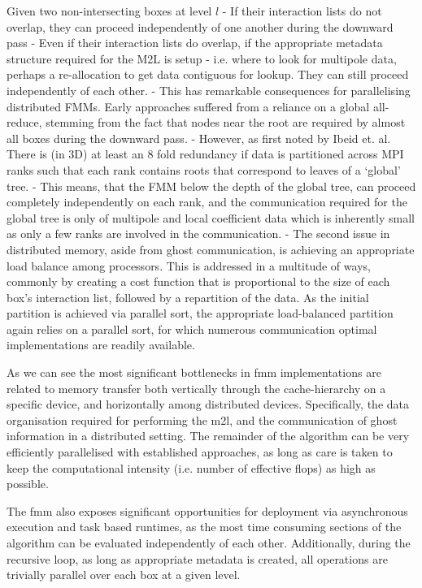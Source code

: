 Given two non-intersecting boxes at level $l$
- If their interaction lists do not overlap, they can proceed independently of one another during the downward pass
- Even if their interaction lists do overlap, if the appropriate metadata structure required for the M2L is setup - i.e. where to look for multipole data, perhaps a re-allocation to get data contiguous for lookup. They can still proceed independently of each other.
- This has remarkable consequences for parallelising distributed FMMs. Early approaches suffered from a reliance on a global all-reduce, stemming from the fact that nodes near the root are required by almost all boxes during the downward pass.
- However, as first noted by Ibeid et. al. There is (in 3D) at least an 8 fold redundancy if data is partitioned across MPI ranks such that each rank contains roots that correspond to leaves of a `global' tree.
- This means, that the FMM below the depth of the global tree, can proceed completely independently on each rank, and the communication required for the global tree is only of multipole and local coefficient data which is inherently small as only a few ranks are involved in the communication.
- The second issue in distributed memory, aside from ghost communication, is achieving an appropriate load balance among processors. This is addressed in a multitude of ways, commonly by creating a cost function that is proportional to the size of each box's interaction list, followed by a repartition of the data. As the initial partition is achieved via parallel sort, the appropriate load-balanced partition again relies on a parallel sort, for which numerous communication optimal implementations are readily available.

As we can see the most significant bottlenecks in \acrshort{fmm} implementations are related to memory transfer both vertically through the cache-hierarchy on a specific device, and horizontally among distributed devices. Specifically, the data organisation required for performing the \acrshort{m2l}, and the communication of ghost information in a distributed setting. The remainder of the algorithm can be very efficiently parallelised with established approaches, as long as care is taken to keep the computational intensity (i.e. number of effective flops) as high as possible.

The \acrshort{fmm} also exposes significant opportunities for deployment via asynchronous execution and task based runtimes, as the most time consuming sections of the algorithm can be evaluated independently of each other. Additionally, during the recursive loop, as long as appropriate metadata is created, all operations are trivially parallel over each box at a given level.

